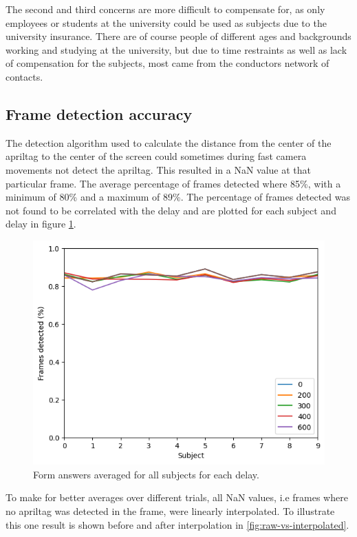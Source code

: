\documentclass[nofilelist]{cslthse-msc}
\begin{document}
The second and third concerns are more difficult to compensate for, as only employees or students at the university could be used as subjects due to the university insurance. There are of course people of different ages and backgrounds working and studying at the university, but due to time restraints as well as lack of compensation for the subjects, most came from the conductors network of contacts.

\subsection{Frame detection accuracy}
The detection algorithm used to calculate the distance from the center of the apriltag to the center of the screen could sometimes during fast camera movements not detect the apriltag. This resulted in a NaN value at that particular frame. The average percentage of frames detected where 85\%, with a minimum of 80\% and a maximum of 89\%. The percentage of frames detected was not found to be correlated with the delay and are plotted for each subject and delay in figure \ref{fig:frames-detected}. 

\begin{figure}[!hbt]
   \centering
   \includegraphics[scale=0.5]{images/frames-detected.png} 
   \caption{Form answers averaged for all subjects for each delay.}
   \label{fig:frames-detected}
\end{figure}

To make for better averages over different trials, all NaN values, i.e frames where no apriltag was detected in the frame, were linearly interpolated. To illustrate this one result is shown before and after interpolation in \ref{fig:raw-vs-interpolated}. 
\end{document}
